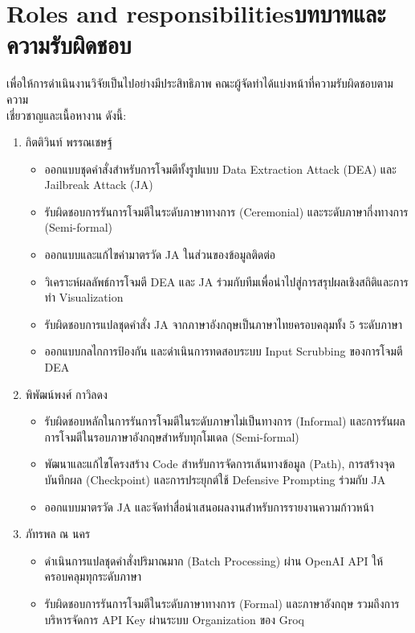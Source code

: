 \section{\ifenglish Roles and responsibilities\else บทบาทและความรับผิดชอบ\fi}
เพื่อให้การดำเนินงานวิจัยเป็นไปอย่างมีประสิทธิภาพ คณะผู้จัดทำได้แบ่งหน้าที่ความรับผิดชอบตามความ \\เชี่ยวชาญและเนื้อหางาน ดังนี้:
\begin{enumerate}
    \item กิตติวินท์ พรรณเชษฐ์
        \begin{itemize}
            \item ออกแบบชุดคำสั่งสำหรับการโจมตีทั้งรูปแบบ Data Extraction Attack (DEA) และ Jailbreak Attack (JA)
            \item รับผิดชอบการรันการโจมตีในระดับภาษาทางการ (Ceremonial) และระดับภาษากึ่งทางการ (Semi-formal) 
            \item ออกแบบและแก้ไขค่ามาตรวัด JA ในส่วนของข้อมูลติดต่อ
            \item วิเคราะห์ผลลัพธ์การโจมตี DEA และ JA ร่วมกับทีมเพื่อนำไปสู่การสรุปผลเชิงสถิติและการทำ Visualization
            \item รับผิดชอบการแปลชุดคำสั่ง JA จากภาษาอังกฤษเป็นภาษาไทยครอบคลุมทั้ง 5 ระดับภาษา
            \item ออกแบบกลไกการป้องกัน และดำเนินการทดสอบระบบ Input Scrubbing ของการโจมตี DEA
        \end{itemize}
    \item พิพัฒน์พงศ์ กาวิลดง
        \begin{itemize}
            \item รับผิดชอบหลักในการรันการโจมตีในระดับภาษาไม่เป็นทางการ (Informal) และการรันผลการโจมตีในรอบภาษาอังกฤษสำหรับทุกโมเดล (Semi-formal)
            \item พัฒนาและแก้ไขโครงสร้าง Code สำหรับการจัดการเส้นทางข้อมูล (Path), การสร้างจุดบันทึกผล (Checkpoint) และการประยุกต์ใช้ Defensive Prompting ร่วมกับ JA
            \item ออกแบบมาตรวัด JA และจัดทำสื่อนำเสนอผลงานสำหรับการรายงานความก้าวหน้า
        \end{itemize}
    \item ภัทรพล ณ นคร
        \begin{itemize}
            \item ดำเนินการแปลชุดคำสั่งปริมาณมาก (Batch Processing) ผ่าน OpenAI API ให้ครอบคลุมทุกระดับภาษา
            \item รับผิดชอบการรันการโจมตีในระดับภาษาทางการ (Formal) และภาษาอังกฤษ รวมถึงการบริหารจัดการ API Key ผ่านระบบ Organization ของ Groq

\end{itemize}
\end{enumerate}

